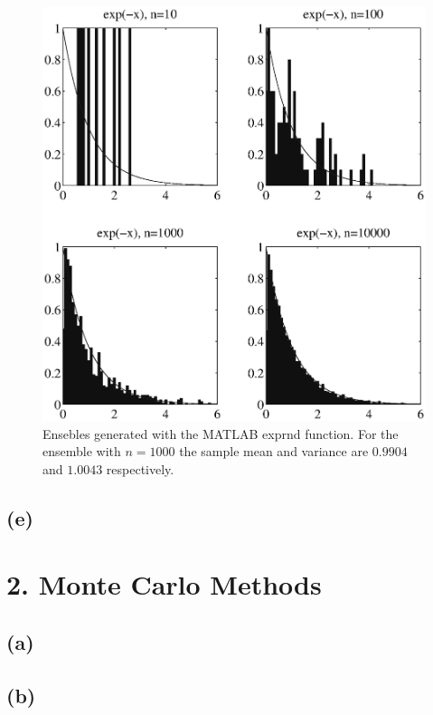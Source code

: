 \documentclass[fleqn, letterpaper]{tufte-handout}
\begin{document}
\begin{figure}
    \includegraphics[width=\textwidth]{problem1e}
    \caption{Ensebles generated with the MATLAB {\ttfamily exprnd} function.
    For the ensemble with $n=1000$ the sample mean and variance are $0.9904$ and $1.0043$ respectively.}
    \label{exprnd}
\end{figure}
\small
\begin{minipage}{\linewidth}

\end{minipage}
\subsection{(e)}

\section{2. Monte Carlo Methods}
\subsection{(a)}
\subsection{(b)}
\end{document}
